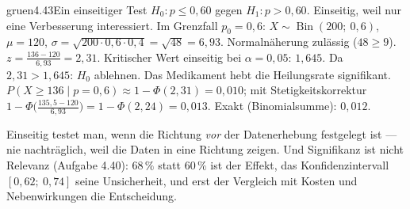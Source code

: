 \begin{loesungkarte}{gruen}{4.43}{Ein einseitiger Test}
$H_0\colon p\le0{,}60$ gegen $H_1\colon p > 0{,}60$. Einseitig, weil nur eine Verbesserung interessiert.
Im Grenzfall $p_0 = 0{,}6$: $X\sim\operatorname{Bin}(200;\ 0{,}6)$, $\mu = 120$, $\sigma = \sqrt{200\cdot0{,}6\cdot0{,}4} = \sqrt{48} = 6{,}93$. Normalnäherung zulässig ($48\ge9$).
$z = \frac{136 - 120}{6{,}93} = 2{,}31$. Kritischer Wert einseitig bei $\alpha = 0{,}05$: $1{,}645$. Da $2{,}31 > 1{,}645$: $H_0$ ablehnen. Das Medikament hebt die Heilungsrate signifikant.
$P(X\ge136\mid p = 0{,}6)\approx1 - \Phi(2{,}31) = 0{,}010$; mit Stetigkeitskorrektur $1 - \Phi\bigl(\frac{135{,}5 - 120}{6{,}93}\bigr) = 1 - \Phi(2{,}24) = 0{,}013$. Exakt (Binomialsumme): $0{,}012$.
\begin{mitnehmen}\kastentext
Einseitig testet man, wenn die Richtung \emph{vor} der Datenerhebung festgelegt ist --- nie nachträglich, weil die Daten in eine Richtung zeigen. Und Signifikanz ist nicht Relevanz (Aufgabe 4.40): $68\,\%$ statt $60\,\%$ ist der Effekt, das Konfidenzintervall $[0{,}62;\ 0{,}74]$ seine Unsicherheit, und erst der Vergleich mit Kosten und Nebenwirkungen die Entscheidung.
\end{mitnehmen}
\end{loesungkarte}
